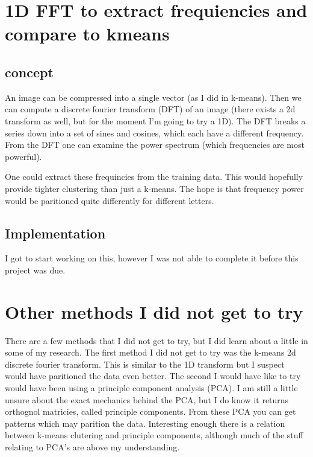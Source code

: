 \documentclass[a4paper]{article}
\begin{document}
\section{1D FFT to extract frequiencies and compare to kmeans}

\subsection{concept}

An image can be compressed into a single vector (as I did in k-means). Then we can compute a discrete fourier transform (DFT) of an image (there exists a 2d transform as well, but for the moment I'm going to try a 1D). The DFT breaks a series down into a set of sines and cosines, which each have a different frequency. From the DFT one can examine the power spectrum (which frequencies are most powerful).

One could extract these frequincies from the training data. This would hopefully provide tighter clustering than just a k-means. The hope is that frequency power would be paritioned quite differently for different letters.

\subsection{Implementation}
	
    I got to start working on this, however I was not able to complete it before this project was due.

\section{Other methods I did not get to try}

There are a few methods that I did not get to try, but I did learn about a little in some of my research. The first method I did not get to try was the k-means 2d discrete fourier transform. This is similar to the 1D transform but I suspect would have paritioned the data even better. The second I would have like to try would have been using a principle component analysis (PCA). I am still a little unsure about the exact mechanics behind the PCA, but I do know it returns orthognol matricies, called principle components. From these PCA you can get patterns which may parition the data. Interesting enough there is a relation between k-means clutering and principle components, although much of the stuff relating to PCA's are above my understanding.
\end{document}
